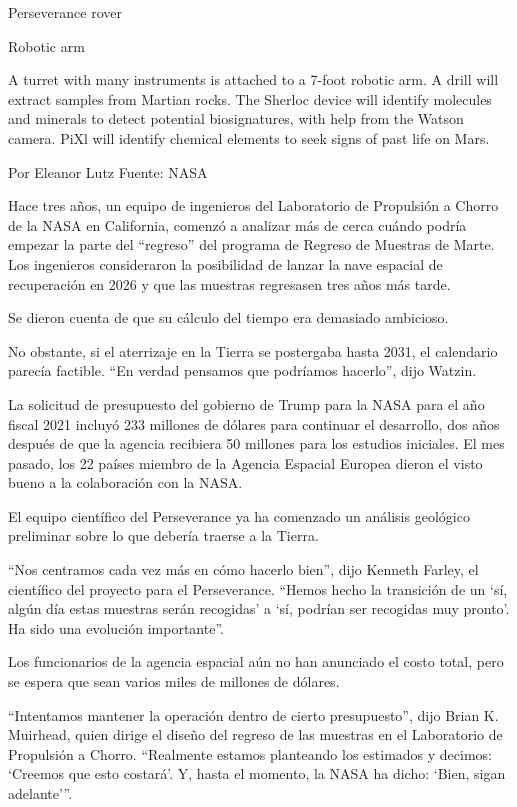 Perseverance rover

Robotic arm

A turret with many instruments is attached to a 7-foot robotic arm. A
drill will extract samples from Martian rocks. The Sherloc device will
identify molecules and minerals to detect potential biosignatures, with
help from the Watson camera. PiXl will identify chemical elements to
seek signs of past life on Mars.

Por Eleanor Lutz \textbar{} Fuente: NASA

Hace tres años, un equipo de ingenieros del Laboratorio de Propulsión a
Chorro de la NASA en California, comenzó a analizar más de cerca cuándo
podría empezar la parte del ``regreso'' del programa de Regreso de
Muestras de Marte. Los ingenieros consideraron la posibilidad de lanzar
la nave espacial de recuperación en 2026 y que las muestras regresasen
tres años más tarde.

Se dieron cuenta de que su cálculo del tiempo era demasiado ambicioso.

No obstante, si el aterrizaje en la Tierra se postergaba hasta 2031, el
calendario parecía factible. ``En verdad pensamos que podríamos
hacerlo'', dijo Watzin.

La solicitud de presupuesto del gobierno de Trump para la NASA para el
año fiscal 2021 incluyó 233 millones de dólares para continuar el
desarrollo, dos años después de que la agencia recibiera 50 millones
para los estudios iniciales. El mes pasado, los 22 países miembro de la
Agencia Espacial Europea dieron el visto bueno a la colaboración con la
NASA.

El equipo científico del Perseverance ya ha comenzado un análisis
geológico preliminar sobre lo que debería traerse a la Tierra.

``Nos centramos cada vez más en cómo hacerlo bien'', dijo Kenneth
Farley, el científico del proyecto para el Perseverance. ``Hemos hecho
la transición de un `sí, algún día estas muestras serán recogidas' a
`sí, podrían ser recogidas muy pronto'. Ha sido una evolución
importante''.

Los funcionarios de la agencia espacial aún no han anunciado el costo
total, pero se espera que sean varios miles de millones de dólares.

``Intentamos mantener la operación dentro de cierto presupuesto'', dijo
Brian K. Muirhead, quien dirige el diseño del regreso de las muestras en
el Laboratorio de Propulsión a Chorro. ``Realmente estamos planteando
los estimados y decimos: `Creemos que esto costará'. Y, hasta el
momento, la NASA ha dicho: `Bien, sigan adelante'''.


